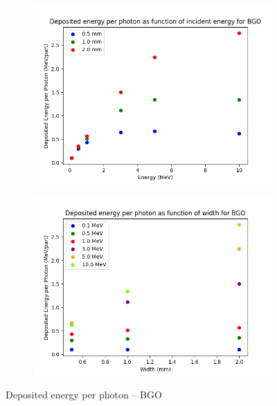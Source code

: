 \documentclass{article}
\begin{document}
\newpage

\begin{figure}[H]
\centering
\begin{subfigure}{.5\textwidth}
  \centering
  \includegraphics[width=\linewidth]{images/task3/dep_en_BGO.png}
  \caption{}
\end{subfigure}%
\begin{subfigure}{.5\textwidth}
  \centering
  \includegraphics[width=\linewidth]{images/task3/dep_en_width_BGO.png}
  \caption{}
\end{subfigure}
\caption{Deposited energy per photon – BGO}
\end{figure}
\end{document}
